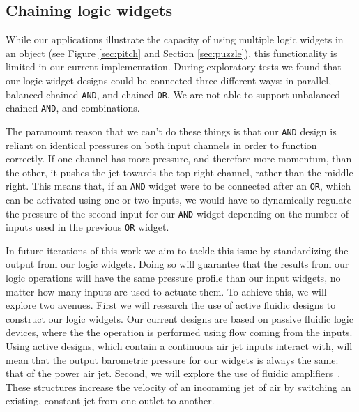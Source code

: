       \subsection{Chaining logic widgets}
        While our applications illustrate the capacity of using multiple
        logic widgets in an \al object (see Figure \ref{sec:pitch} and
        Section \ref{sec:puzzle}), this functionality is limited in our current
        implementation. During exploratory tests we found that our logic
        widget designs could be connected three different ways: in
        parallel, balanced chained \texttt{AND}, and chained \texttt{OR}. We are
        not able to support unbalanced chained \texttt{AND}, and combinations.

        The paramount reason that we can't do these things is that our
        \texttt{AND} design is reliant on identical pressures on both input
        channels in order to function correctly. If one channel has more
        pressure, and therefore more momentum, than the other, it pushes
        the jet towards the top-right channel, rather than the middle
        right. This means that, if an \texttt{AND} widget were to be
        connected after an \texttt{OR}, which can be activated using one or
        two inputs, we would have to dynamically regulate the pressure of
        the second input for our \texttt{AND} widget depending on the
        number of inputs used in the previous \texttt{OR} widget.

        In future iterations of this work we aim to tackle this issue by
        standardizing the output from our logic widgets. Doing so will
        guarantee that the results from our logic operations will have the
        same pressure profile than our input widgets, no matter how many
        inputs are used to actuate them. To achieve this, we will explore
        two avenues. First we will research the use of active fluidic
        designs to construct our logic widgets. Our current designs are
        based on passive fluidic logic devices, where the the operation is
        performed using flow coming from the inputs. Using active designs, which
        contain a continuous air jet inputs interact with, will mean that the
        output barometric pressure for our widgets is always the same: that of
        the power air jet. Second, we will explore the use of fluidic
        amplifiers~\cite{CharlesBelsterling:1971}.  These structures increase
        the velocity of an incomming jet of air by switching an existing,
        constant jet from one outlet to another.
        
